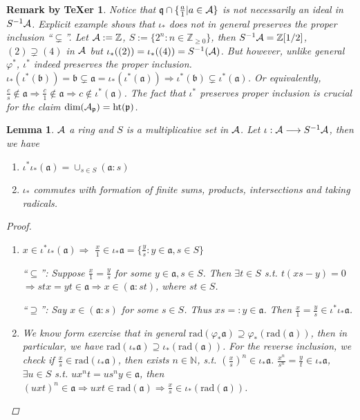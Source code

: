\documentclass[11pt]{article}
\newtheorem{lemma}[thm]{Lemma}
\newtheorem{rmkt}[thm]{Remark by TeXer}
\newcommand{\intg}{\mathbb Z}
\newcommand{\sca}{{\mathfrak a}}
\newcommand{\scb}{{\mathfrak b}}
\newcommand{\scp}{{\mathfrak p}}
\newcommand{\scq}{\mathfrak q}
\newcommand{\cala}{{\cal A}}
\newcommand{\Lrta}{\Longrightarrow}
\newcommand{\lrta}{\longrightarrow}
\begin{document}
\begin{rmkt}
  Notice that $\scq\cap\{\frac{a}{1}|a\in\cala\}$ is not necessarily an ideal in $S^{-1}\cala$. Explicit example shows that $\iota_*$ does not in general preserves the proper inclusion ``$\subsetneq$''. Let $\cala:=\intg$, $S:=\{2^n:n\in \intg_{\geq 0}\}$, then $S^{-1}\cala=\intg[1/2]$, $(2)\supsetneq (4)$ in $\cala$ but $\iota_*((2))=\iota_*((4))=S^{-1}(\cala)$. But however, unlike general $\varphi^*$, $\iota^*$ indeed preserves the proper inclusion. $\iota_*(\iota^*(\scb))=\scb\subsetneq \sca=\iota_*(\iota^*(\sca))\Lrta \iota^*(\scb)\subsetneq \iota^*(\sca)$. Or equivalently, $\frac{c}{s}\notin \sca\Lrta \frac{c}{1}\notin\sca\Lrta c\notin\iota^*(\sca)$. The fact that $\iota^*$ preserves proper inclusion is crucial for the claim $\text{dim}(\cala_\scp)=\text{ht}(\scp)$.
\end{rmkt}

{\color{red}
\begin{lemma}\label{lem:radical_commutates_localization}
$\cala$ a ring and $S$ is a multiplicative set in $\cala$. Let $\iota:\cala\lrta S^{-1}\cala$, then we have
\begin{enumerate}[label=(\alph*)]
\item $\iota^*\iota_*(\sca)=\cup_{s\in S}(\sca:s)$
\item $\iota_*$ commutes with formation of finite sums, products, intersections and taking radicals.
\end{enumerate}
\begin{proof}
\begin{enumerate}[label=(\alph*)]
\item 
$x\in \iota^*\iota_*(\sca)\Lrta $ $\frac{x}{1}\in\iota_*\sca=\{\frac{y}{s}:y\in\sca,s\in S\}$

``$\subseteq$'': Suppose $\frac{x}{1}=\frac{y}{s}$ for some $y\in\sca,s\in S$. Then $\exists t\in S$ s.t. $t(xs-y)=0$ $\Lrta stx=yt \in \sca\Lrta x\in (\sca:st)$, where $st\in S$.

``$\supseteq$'': Say $x\in (\sca:s)$ for some $s\in S$. Thus $xs=:y \in\sca$. Then $\frac{x}{1}=\frac{y}{s}\in \iota^*\iota_*\sca$. 
\item We know form exercise that in general $\text{rad}(\varphi_*\sca)\supseteq\varphi_*(\text{rad}(\sca))$, then in particular, we have $\text{rad}(\iota_*\sca)\supseteq\iota_*(\text{rad}(\sca))$. For the reverse inclusion, we check if $\frac{x}{s}\in \text{rad}(\iota_*\sca)$, then exists $n\in\mathbb{N}$, s.t. $\left(\frac{x}{s}\right)^n\in \iota_*\sca$. $\frac{x^n}{s^n}=\frac{y}{t}\in\iota_*\sca$, $\exists u\in S$ s.t. $u x^n t=u s^n y\in\sca$, then $(uxt)^n\in\sca\Lrta uxt\in\text{rad}(\sca)\Lrta \frac{x}{s}\in \iota_*(\text{rad}(\sca))$.
\end{enumerate}
\end{proof}
\end{lemma}
}
\end{document}
